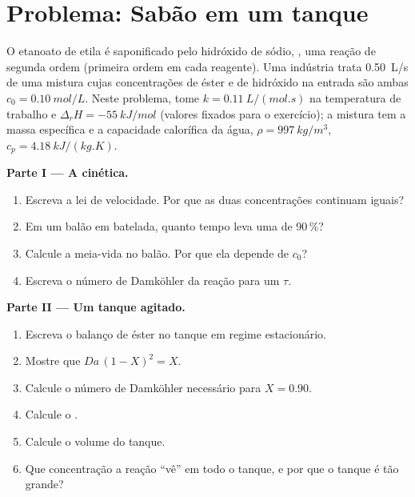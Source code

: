 \section{Problema: Sabão em um tanque}

\begin{problem}
\label{pb:b2:continuous-reactors:1}
O etanoato de etila é saponificado pelo hidróxido de sódio,
, uma reação de segunda ordem
(primeira ordem em cada reagente). Uma indústria trata \qty{0.50}{L/s} de uma
mistura cujas concentrações de éster e de hidróxido na entrada são ambas $c_0 =
\qty{0.10}{mol/L}$. Neste problema, tome $k = \qty{0.11}{L/(mol.s)}$ na
temperatura de trabalho e $\Delta_r H = \qty{-55}{kJ/mol}$ (valores fixados
para o exercício); a mistura tem a massa específica e a capacidade calorífica
da água, $\rho = \qty{997}{kg/m^3}$, $c_p = \qty{4.18}{kJ/(kg.K)}$.

\medskip
\noindent\textbf{Parte I --- A cinética.}
\begin{enumerate}
  \item Escreva a lei de velocidade. Por que as duas concentrações continuam iguais?
  \item Em um balão em batelada, quanto tempo leva uma  de 90\,\%?
  \item Calcule a meia-vida no balão. Por que ela depende de $c_0$?
  \item Escreva o número de Damköhler da reação para um  $\tau$.
\end{enumerate}

\medskip
\noindent\textbf{Parte II --- Um tanque agitado.}
\begin{enumerate}[resume]
  \item Escreva o balanço de éster no tanque em regime estacionário.
  \item Mostre que $Da\,(1 - X)^2 = X$.
  \item Calcule o número de Damköhler necessário para $X = 0.90$.
  \item Calcule o .
  \item Calcule o volume do tanque.
  \item Que concentração a reação ``vê'' em todo o tanque, e por que o tanque
        é tão grande?
\end{enumerate}


\end{problem}
